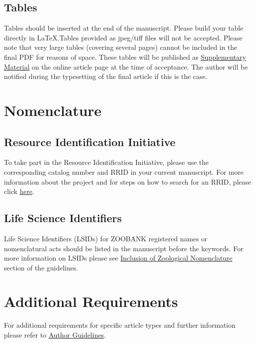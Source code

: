 \documentclass{frontiersSCNS} %
\begin{document}
\subsection{Tables}
Tables should be inserted at the end of the manuscript. Please build your table directly in LaTeX.Tables provided as jpeg/tiff files will not be accepted. Please note that very large tables (covering several pages) cannot be included in the final PDF for reasons of space. These tables will be published as \href{http://home.frontiersin.org/about/author-guidelines#SupplementaryMaterial}{Supplementary Material} on the online article page at the time of acceptance. The author will be notified during the typesetting of the final article if this is the case. 

\section{Nomenclature}

\subsection{Resource Identification Initiative}
To take part in the Resource Identification Initiative, please use the corresponding catalog number and RRID in your current manuscript. For more information about the project and for steps on how to search for an RRID, please click \href{http://www.frontiersin.org/files/pdf/letter_to_author.pdf}{here}.

\subsection{Life Science Identifiers}
Life Science Identifiers (LSIDs) for ZOOBANK registered names or nomenclatural acts should be listed in the manuscript before the keywords. For more information on LSIDs please see \href{http://www.frontiersin.org/about/AuthorGuidelines#InclusionofZoologicalNomenclature}{Inclusion of Zoological Nomenclature} section of the guidelines.


\section{Additional Requirements}

For additional requirements for specific article types and further information please refer to \href{http://www.frontiersin.org/about/AuthorGuidelines#AdditionalRequirements}{Author Guidelines}.
\end{document}
